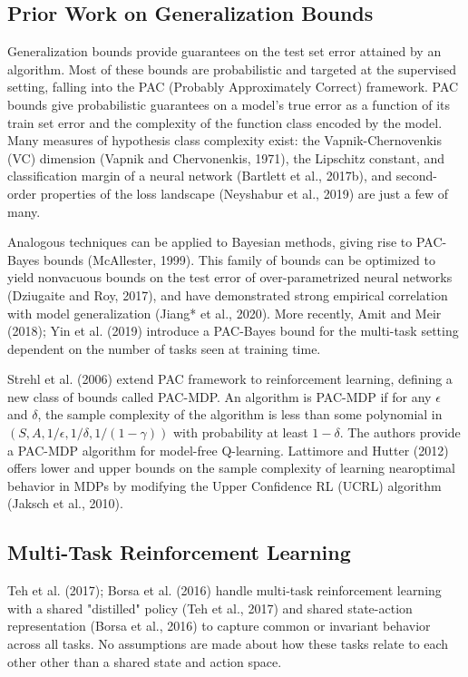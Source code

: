 \documentclass[10pt]{article}
\begin{document}
\subsection{Prior Work on Generalization Bounds}
Generalization bounds provide guarantees on the test set error attained by an algorithm. Most of these bounds are probabilistic and targeted at the supervised setting, falling into the PAC (Probably Approximately Correct) framework. PAC bounds give probabilistic guarantees on a model's true error as a function of its train set error and the complexity of the function class encoded by the model. Many measures of hypothesis class complexity exist: the Vapnik-Chernovenkis (VC) dimension (Vapnik and Chervonenkis, 1971), the Lipschitz constant, and classification margin of a neural network (Bartlett et al., 2017b), and second-order properties of the loss landscape (Neyshabur et al., 2019) are just a few of many.

Analogous techniques can be applied to Bayesian methods, giving rise to PAC-Bayes bounds (McAllester, 1999). This family of bounds can be optimized to yield nonvacuous bounds on the test error of over-parametrized neural networks (Dziugaite and Roy, 2017), and have demonstrated strong empirical correlation with model generalization (Jiang* et al., 2020). More recently, Amit and Meir (2018); Yin et al. (2019) introduce a PAC-Bayes bound for the multi-task setting dependent on the number of tasks seen at training time.

Strehl et al. (2006) extend PAC framework to reinforcement learning, defining a new class of bounds called PAC-MDP. An algorithm is PAC-MDP if for any $\epsilon$ and $\delta$, the sample complexity of the algorithm is less than some polynomial in $(S, A, 1 / \epsilon, 1 / \delta, 1 /(1-\gamma))$ with probability at least $1-\delta$. The authors provide a PAC-MDP algorithm for model-free Q-learning. Lattimore and Hutter (2012) offers lower and upper bounds on the sample complexity of learning nearoptimal behavior in MDPs by modifying the Upper Confidence RL (UCRL) algorithm (Jaksch et al., 2010).

\subsection{Multi-Task Reinforcement Learning}
Teh et al. (2017); Borsa et al. (2016) handle multi-task reinforcement learning with a shared "distilled" policy (Teh et al., 2017) and shared state-action representation (Borsa et al., 2016) to capture common or invariant behavior across all tasks. No assumptions are made about how these tasks relate to each other other than a shared state and action space.
\end{document}
